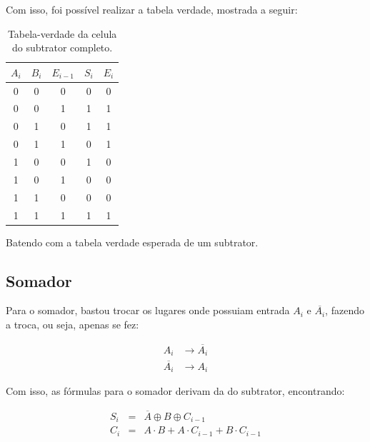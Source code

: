 Com isso, foi possível realizar a tabela verdade, mostrada a seguir:

\begin{table}[!ht]
    \centering
    \caption{Tabela-verdade da celula do subtrator completo.}
    \begin{tabular}{ccccc}
        \toprule
        $A_i$ & $B_i$ & $E_{i-1}$ & $S_i$ & $E_i$ \\
        \midrule
        0     & 0     & 0         & 0     & 0     \\
        0     & 0     & 1         & 1     & 1     \\
        0     & 1     & 0         & 1     & 1     \\
        0     & 1     & 1         & 0     & 1     \\
        1     & 0     & 0         & 1     & 0     \\
        1     & 0     & 1         & 0     & 0     \\
        1     & 1     & 0         & 0     & 0     \\
        1     & 1     & 1         & 1     & 1     \\
        \bottomrule
    \end{tabular}
    \label{tab:Subtrator}
\end{table}

Batendo com a tabela verdade esperada de um subtrator.

\subsection{Somador}

Para o somador, bastou trocar os lugares onde possuiam entrada $A_i$ e $\overline{A_i}$, fazendo a troca, ou seja, apenas se fez:

\begin{equation}
    \begin{aligned}
        A_i            & \rightarrow \overline{A_i} \\
        \overline{A_i} & \rightarrow {A_i}
    \end{aligned}
\end{equation}

Com isso, as fórmulas para o somador derivam da do subtrator, encontrando:

\begin{equation}
    \begin{array}{rcl}
        S_i & = & \overline{A} \oplus B \oplus C_{i-1}        \\
        C_i & = & A \cdot B + A\cdot C_{i-1} + B\cdot C_{i-1}
    \end{array}
\end{equation}

